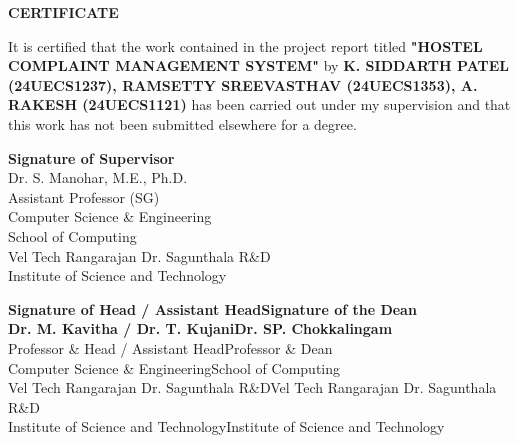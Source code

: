 \documentclass[10pt]{report}
\begin{document}
\newpage
\pagecolor{white}
\color{black}
\begin{center}
{\Huge \textbf{CERTIFICATE}}\\[1cm]
\end{center}
\linespread{1.5}
\begin{sloppypar}
\large It is certified that the work contained in the project report titled \textbf{"HOSTEL COMPLAINT MANAGEMENT SYSTEM"} by \textbf{K. SIDDARTH PATEL (24UECS1237), RAMSETTY SREEVASTHAV (24UECS1353), A. RAKESH (24UECS1121)} has been carried out under my supervision and that this work has not been submitted elsewhere for a degree.
\end{sloppypar}
\vspace{1.5cm}
\begin{flushright}
\textbf{Signature of Supervisor}\\
Dr. S. Manohar, M.E., Ph.D.\\
Assistant Professor (SG)\\
Computer Science \& Engineering\\
School of Computing\\
Vel Tech Rangarajan Dr. Sagunthala R\&D\\
Institute of Science and Technology
\end{flushright}
\vspace{1.5cm}

\begin{flushleft}
\textbf{Signature of Head / Assistant Head}\hfill\textbf{Signature of the Dean}\\[0.3cm]
\textbf{Dr. M. Kavitha / Dr. T. Kujani}\hfill\textbf{Dr. SP. Chokkalingam}\\
Professor \& Head / Assistant Head\hfill Professor \& Dean\\
Computer Science \& Engineering\hfill School of Computing\\
Vel Tech Rangarajan Dr. Sagunthala R\&D\hfill Vel Tech Rangarajan Dr. Sagunthala R\&D\\
Institute of Science and Technology\hfill Institute of Science and Technology
\end{flushleft}
\vspace{1.0cm}
\end{document}
